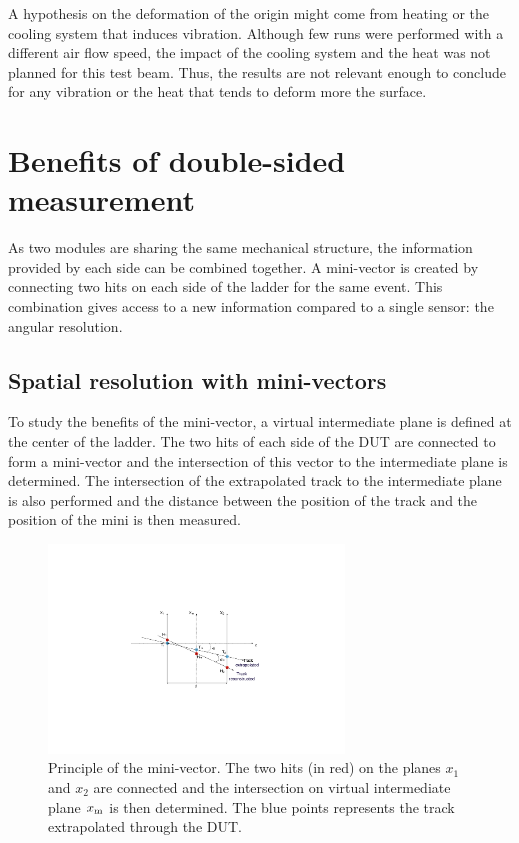       A hypothesis on the deformation of the origin might come from heating or the cooling system that induces vibration.
      Although few runs were performed with a different air flow speed, the impact of the cooling system and the heat was not planned for this test beam.
      Thus, the results are not relevant enough to conclude for any vibration or the heat that tends to deform more the surface.
    
  \section{Benefits of double-sided measurement}
  
  As two modules are sharing the same mechanical structure, the information provided by each side can be combined together.
  A mini-vector is created by connecting two hits on each side of the ladder for the same event.
  This combination gives access to a new information compared to a single sensor: the angular resolution.

    \subsection{Spatial resolution with mini-vectors}

    To study the benefits of the mini-vector, a virtual intermediate plane is defined at the center of the ladder.
    The two hits of each side of the \gls{DUT} are connected to form a mini-vector and the intersection of this vector to the intermediate plane is determined.
    The intersection of the extrapolated track to the intermediate plane is also performed and the distance between the position of the track and the position of the mini is then measured.

    \begin{figure}[!h]
      \centering
      \includegraphics[width=0.7\textwidth]{Pictures/deformation/mini_vectors.pdf}
      \caption{Principle of the mini-vector. The two hits (in red) on the planes $x_1$ and $x_2$ are connected and the intersection on virtual intermediate plane $x_{\rm{m}}$ is then determined. The blue points represents the track extrapolated through the DUT. }
      \label{fig:MV}
    \end{figure}

